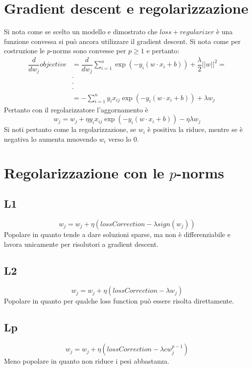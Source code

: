 \section{Gradient descent e regolarizzazione}
Si nota come se scelto un modello e dimostrato che $loss+regularizer$ \`e una funzione convessa si pu\`o ancora utilizzare il gradient descent.
Si nota come per costruzione le $p$-norms sono convesse per $p\ge 1$ e pertanto:
\begin{align*}
	\dfrac{d}{dw_j}objective&=\dfrac{d}{dw_j}\sum\limits_{i=1}^n\exp(-y_i(w\cdot x_i + b))+\dfrac{\lambda}{2}||w||^2=\\
				&\cdot\\
				&\cdot\\
				&\cdot\\
				&=-\sum\limits_{i=1}^ny_ix_{ij}\exp(-y_i(w\cdot x_i+b))+\lambda w_j
\end{align*}
Pertanto con il regolarizzatore l'aggornamento \`e
$$w_j=w_j+\eta y_ix_{ij}\exp(-y_i(w\cdot x_i+b))-\eta\lambda w_j$$
Si noti pertanto come la regolarizzazione, se $w_i$ \`e positiva la riduce, mentre se \`e negativa lo aumenta muovendo $w_i$ verso lo $0$.

\section{Regolarizzazione con le $p$-norms}

	\subsection{L1}
	$$w_j = w_j + \eta(lossCorrection - \lambda sign(w_j))$$
	Popolare in quanto tende a dare soluzioni sparse, ma non \`e differenziabile e lavora unicamente per risolutori a gradient descent.

	\subsection{L2}
	$$w_j = w_j + \eta(lossCorrection - \lambda w_j)$$
	Popolare in quanto per qualche loss function pu\`o essere risolta direttamente.

	\subsection{Lp}
	$$w_j = w_j + \eta(lossCorrection - \lambda cw_j^{p-1})$$
	Meno popolare in quanto non riduce i pesi abbastanza.

